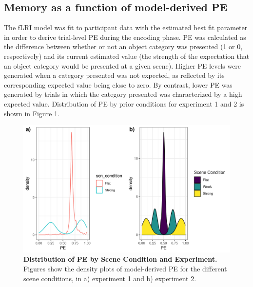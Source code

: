 \documentclass[a4paper,12pt]{article} 			%
\begin{document}
\subsection{Memory as a function of model-derived PE}
The fLRI model was fit to participant data with the estimated best fit parameter in order to derive trial-level PE during the encoding phase. PE was calculated as the difference between whether or not an object category was presented (1 or 0, respectively) and its current estimated value (the strength of the expectation that an object category would be presented at a given scene). Higher PE levels were generated when a category presented was not expected, as reflected by its corresponding expected value being close to zero. By contrast, lower PE was generated by trials in which the category presented was characterized by a high expected value. Distribution of PE by prior conditions for experiment 1 and 2 is shown in Figure \ref{fig:PE_distr}. 

\begin{figure}[ht!]
\centerline
{\includegraphics[width=1.5\textwidth]{figures/PEdistr_fLR_instr.All.png}}
\caption{\textbf{Distribution of PE by Scene Condition and Experiment.} Figures show the density plots of model-derived PE for the different scene conditions, in a) experiment 1 and b) experiment 2.  }
\label{fig:PE_distr}
\end{figure}
\end{document}
